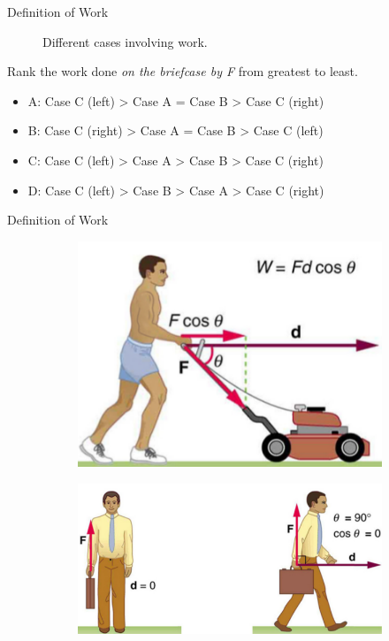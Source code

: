 \documentclass{beamer}
\begin{document}
\begin{frame}{Definition of Work}
\begin{figure}
\begin{subfigure}{0.43\textwidth}
\caption{}
\end{subfigure}
\caption{\label{fig:workvisual2} Different cases involving work.}
\end{figure}
\small
Rank the work done \textit{on the briefcase by F} from greatest to least.
\begin{itemize}
\item A: Case C (left) > Case A = Case B > Case C (right)
\item B: Case C (right) > Case A = Case B > Case C (left)
\item C: Case C (left) > Case A > Case B > Case C (right)
\item D: Case C (left) > Case B > Case A > Case C (right)
\end{itemize}
\end{frame}

\begin{frame}{Definition of Work}
\begin{figure}
\centering
\begin{subfigure}{0.3\textwidth}
\centering
\includegraphics[width=\textwidth]{figures/lawn1.png}
\caption{}
\end{subfigure}
\begin{subfigure}{0.135\textwidth}
\centering
\includegraphics[width=\textwidth,trim=0cm 0cm 15cm 0cm,clip=true]{figures/lawn2.png}

\end{subfigure}
\end{figure}
\end{frame}
\end{document}
